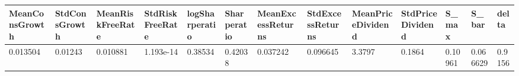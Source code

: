 \begin{tabular}{lllllllllllll}
\toprule 
MeanConsGrowth & StdConsGrowth & MeanRiskFreeRate & StdRiskFreeRate & logSharperatio & Sharperatio & MeanExcessReturns & StdExcessReturns & MeanPriceDividend & StdPriceDividend & S_max & S_bar & delta \\ 
\midrule 
0.013504 & 0.01243 & 0.010881 & 1.193e-14 & 0.38534 & 0.42038 & 0.037242 & 0.096645 & 3.3797 & 0.1864 & 0.10961 & 0.066629 & 0.9156 \\ 
\bottomrule 
\end{tabular}